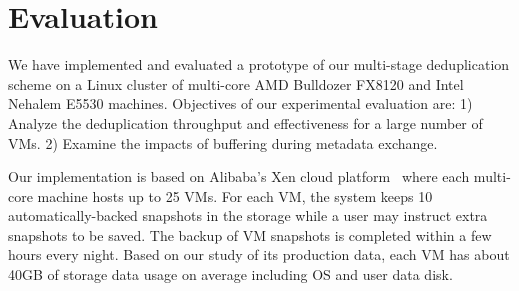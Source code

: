 
\section{Evaluation}
\label{sect:exper}

We have implemented and evaluated a prototype of our multi-stage deduplication scheme on a Linux cluster
of multi-core AMD Bulldozer FX8120 and Intel Nehalem E5530 machines.  Objectives of our experimental evaluation are:
1) Analyze the deduplication throughput and effectiveness for a large number of VMs.
2) Examine the impacts of buffering during metadata exchange.


Our implementation is based on Alibaba's Xen cloud platform~\cite{Aliyun,WeiZhangIEEE}
where each multi-core machine   hosts  up to 25 VMs. 
For each VM, the system keeps 10 automatically-backed snapshots in the storage while
a user may instruct extra snapshots to be saved.
The backup of VM snapshots is completed within a few  hours every night.
Based on our study of its production  data,  each VM has about  40GB of storage  data usage on average
including OS and user data disk. 



